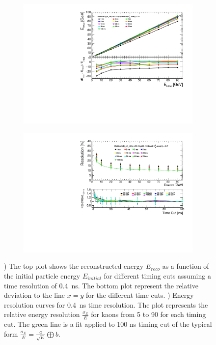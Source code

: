 \begin{figure}[htbp!]
  \centering
  \begin{subfigure}[t]{0.49\textwidth}
    \centering
    \includegraphics[width=1\linewidth]{../Thesis_Plots/ILD/Smearing_0.4ns/Plots/Linearity_TimeCuts_Smearing1}
    \caption{} \label{fig:Lin0.4ns}
  \end{subfigure}
  \hfill
  \begin{subfigure}[t]{0.49\textwidth}
    \centering
    \includegraphics[width=1\linewidth]{../Thesis_Plots/ILD/Smearing_0.4ns/Plots/ShowerResoAbsolute_TimeCuts_Smearing1}
    \caption{} \label{fig:Reso0.4ns}
  \end{subfigure}
  \caption{) The top plot shows the reconstructed energy $E_{reco}$ as a function of the initial particle energy $E_{initial}$ for different timing cuts assuming a time resolution of \SI{0.4}{\nano\second}. The bottom plot represent the relative deviation to the line $x=y$ for the different time cuts. ) Energy resolution curves for \SI{0.4}{\nano\second} time resolution. The plot represents the relative energy resolution $\frac{\sigma_{E}}{E}$ for kaons from 5 to 90 \GeV for each timing cut. The green line is a fit applied to 100 ns timing cut of the typical form $\frac{\sigma_{E}}{E} = \frac{a}{\sqrt{E}} \bigoplus b$.}
\end{figure}


